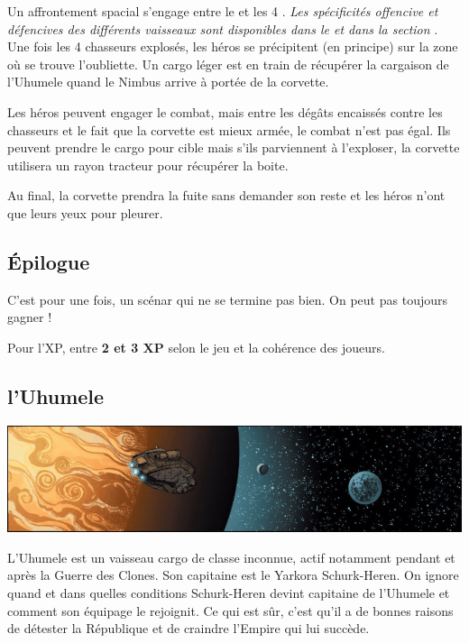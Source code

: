 Un affrontement spacial s’engage entre le  et les 4 . \textit{Les spécificités offencive et défencives des différents vaisseaux sont disponibles dans le  et dans la section }.\\

Une fois les 4 chasseurs explosés, les héros se précipitent (en principe) sur la zone où se trouve l’oubliette. Un cargo léger est en train de récupérer la cargaison de l’Uhumele quand le Nimbus arrive à portée de la corvette.

Les héros peuvent engager le combat, mais entre les dégâts encaissés contre les chasseurs et le fait que la corvette est mieux armée, le combat n’est pas égal. Ils peuvent prendre le cargo pour cible mais s’ils parviennent à l’exploser, la corvette utilisera un rayon tracteur pour récupérer la boite.

Au final, la corvette prendra la fuite sans demander son reste et les héros n’ont que leurs yeux pour pleurer.

\subsection{\'Epilogue}
C’est pour une fois, un scénar qui ne se termine pas bien. On peut pas toujours gagner !

Pour l’XP, entre \textbf{2 et 3 XP} selon le jeu et la cohérence des joueurs.

\clearpage
\subsection{l’Uhumele}\label{sec:uhumele}
\noindent\includegraphics[width=\textwidth]{_img/uhumele-pano.png}

L'Uhumele est un vaisseau cargo de classe inconnue, actif notamment pendant et après la Guerre des Clones. Son capitaine est le Yarkora Schurk-Heren. On ignore quand et dans quelles conditions Schurk-Heren devint capitaine de l’Uhumele et comment son équipage le rejoignit. Ce qui est sûr, c’est qu’il a de bonnes raisons de détester la République et de craindre l’Empire qui lui succède.

